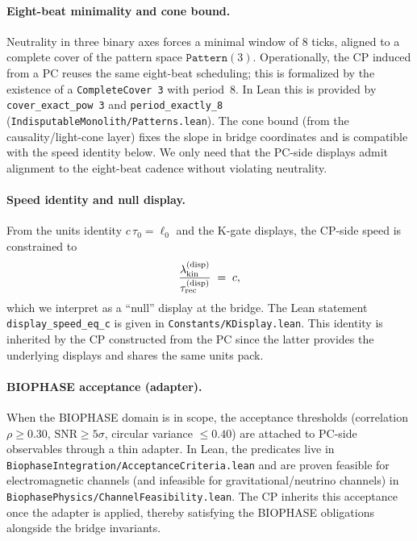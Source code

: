 \documentclass[12pt,a4paper]{article}
\begin{document}
\paragraph{Eight-beat minimality and cone bound.}
Neutrality in three binary axes forces a minimal window of 8 ticks, aligned to a complete cover of the pattern space \(\texttt{Pattern}(3)\). Operationally, the CP induced from a PC reuses the same eight-beat scheduling; this is formalized by the existence of a \texttt{CompleteCover 3} with period~8. In Lean this is provided by \texttt{cover\_exact\_pow 3} and \texttt{period\_exactly\_8} (\texttt{IndisputableMonolith/Patterns.lean}). The cone bound (from the causality/light-cone layer) fixes the slope in bridge coordinates and is compatible with the speed identity below. We only need that the PC-side displays admit alignment to the eight-beat cadence without violating neutrality.

\paragraph{Speed identity and null display.}
From the units identity \(c\,\tau_0=\ell_0\) and the K-gate displays, the CP-side speed is constrained to
\[
  \frac{\lambda_{\rm kin}^{\rm (disp)}}{\tau_{\rm rec}^{\rm (disp)}} \;=\; c,
\]
which we interpret as a ``null'' display at the bridge. The Lean statement \texttt{display\_speed\_eq\_c} is given in \texttt{Constants/KDisplay.lean}. This identity is inherited by the CP constructed from the PC since the latter provides the underlying displays and shares the same units pack.

\paragraph{BIOPHASE acceptance (adapter).}
When the BIOPHASE domain is in scope, the acceptance thresholds (correlation \(\rho\ge 0.30\), \(\mathrm{SNR}\ge 5\sigma\), circular variance \(\le 0.40\)) are attached to PC-side observables through a thin adapter. In Lean, the predicates live in \texttt{BiophaseIntegration/AcceptanceCriteria.lean} and are proven feasible for electromagnetic channels (and infeasible for gravitational/neutrino channels) in \texttt{BiophasePhysics/ChannelFeasibility.lean}. The CP inherits this acceptance once the adapter is applied, thereby satisfying the BIOPHASE obligations alongside the bridge invariants.
\end{document}
